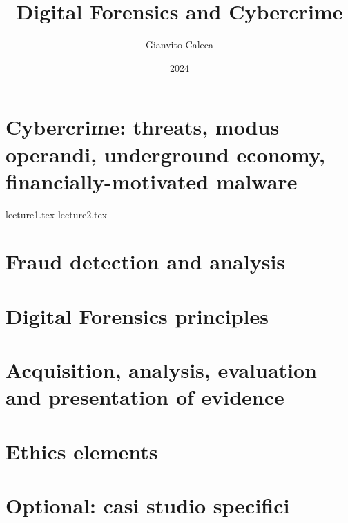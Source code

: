 \documentclass{report}
\title{Digital Forensics and Cybercrime}
\date{2024}
\author{Gianvito Caleca}
\begin{document}
\maketitle
\tableofcontents
\part{Cybercrime: threats, modus operandi, underground economy, financially-motivated malware}
{lecture1.tex}
{lecture2.tex}
\part{Fraud detection and analysis}
\part{Digital Forensics principles}
\part{Acquisition, analysis, evaluation and presentation of evidence}
\part{Ethics elements}
\part{Optional: casi studio specifici}
\end{document}
